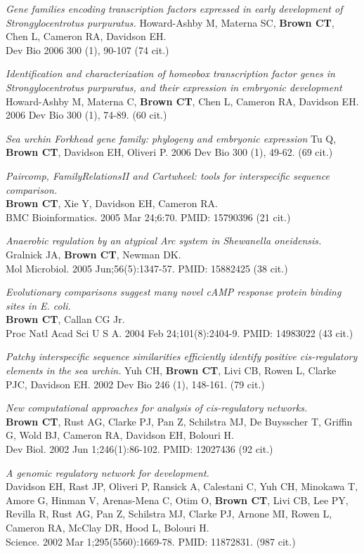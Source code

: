 \documentclass[margin,line]{resume}
\begin{document}
\begin{resume}
{\em Gene families encoding transcription factors expressed in early development of Strongylocentrotus purpuratus.}
Howard-Ashby M, Materna SC, {\bf Brown CT}, Chen L, Cameron RA, Davidson EH.\\
Dev Bio 2006 300 (1), 90-107 (74 cit.)

{\em Identification and characterization of homeobox transcription factor genes in Strongylocentrotus purpuratus, and their expression in embryonic development}
Howard-Ashby M, Materna C, {\bf Brown CT}, Chen L, Cameron RA, Davidson EH.
2006 Dev Bio 300 (1), 74-89.  (60 cit.)

{\em Sea urchin Forkhead gene family: phylogeny and embryonic expression}
Tu Q, {\bf Brown CT}, Davidson EH, Oliveri P.
2006 Dev Bio 300 (1), 49-62. (69 cit.)

{\em Paircomp, FamilyRelationsII and Cartwheel: tools for interspecific sequence comparison.}\\
{\bf Brown CT}, Xie Y, Davidson EH, Cameron RA.\\
BMC Bioinformatics. 2005 Mar 24;6:70.
PMID: 15790396 (21 cit.)

{\em Anaerobic regulation by an
atypical Arc system in {\em Shewanella oneidensis}.}\\
Gralnick JA, {\bf Brown CT}, Newman DK.\\
Mol Microbiol. 2005
Jun;56(5):1347-57.  PMID: 15882425 (38 cit.)

\newpage

{\em Evolutionary comparisons suggest
many novel cAMP response protein binding sites in {\em E. coli}.}\\
{\bf Brown CT}, Callan CG Jr.\\
Proc Natl Acad Sci U S A. 2004 Feb 24;101(8):2404-9.  PMID: 14983022 (43 cit.)

{\em Patchy interspecific sequence similarities efficiently identify positive cis-regulatory elements in the sea urchin.}
Yuh CH, {\bf Brown CT}, Livi CB, Rowen L, Clarke PJC, Davidson EH.
2002 Dev Bio 246 (1), 148-161. (79 cit.)

  {\em New
computational approaches for analysis of {\em cis}-regulatory networks.}  \\
{\bf Brown CT}, Rust AG, Clarke PJ, Pan Z, Schilstra MJ, De Buysscher
T, Griffin G, Wold BJ, Cameron RA, Davidson EH, Bolouri H.\\
Dev Biol. 2002 Jun 1;246(1):86-102.  PMID: 12027436 (92 cit.)

{\em A genomic
regulatory network for development.}\\
Davidson EH, Rast JP, Oliveri P, Ransick A, Calestani C, Yuh CH,
Minokawa T, Amore G, Hinman V, Arenas-Mena C, Otim O, {\bf Brown CT}, Livi
CB, Lee PY, Revilla R, Rust AG, Pan Z, Schilstra MJ, Clarke PJ, Arnone
MI, Rowen L, Cameron RA, McClay DR, Hood L, Bolouri H.
\\Science. 2002 Mar
1;295(5560):1669-78.  PMID: 11872831. (987 cit.)


\end{resume}
\end{document}
